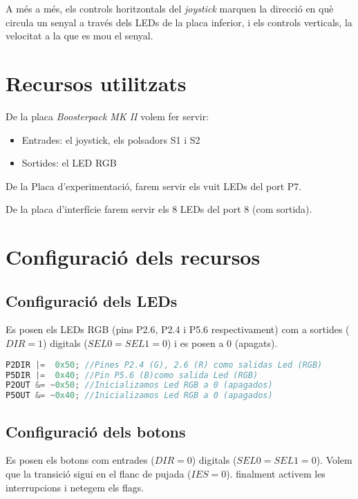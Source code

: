 \documentclass[12pt,a4paper]{article}
\begin{document}
A més a més, els controls horitzontals del \textit{joystick} marquen la direcció
en què circula un senyal a través dels LEDs de la placa inferior, i els controls
verticals, la velocitat a la que es mou el senyal.

\section{Recursos utilitzats}
De la placa \textit{Boosterpack MK II} volem fer servir:

\begin{itemize}
    \item Entrades: el joystick, els polsadors S1 i S2
    \item Sortides: el LED RGB
\end{itemize}

De la Placa d'experimentació, farem servir els vuit LEDs del port P7.

De la placa d'interfície farem servir els 8 LEDs del port 8 (com sortida).

\section{Configuració dels recursos}
\subsection{Configuració dels LEDs}
Es posen els LEDs RGB (pins P2.6, P2.4 i P5.6 respectivament) com a sortides ($DIR = 1$) digitals ($SEL0 = SEL1 = 0$) i es posen a 0 (apagats).

\begin{lstlisting}[language=C++]
P2DIR |=  0x50; //Pines P2.4 (G), 2.6 (R) como salidas Led (RGB)
P5DIR |=  0x40; //Pin P5.6 (B)como salida Led (RGB)
P2OUT &= ~0x50; //Inicializamos Led RGB a 0 (apagados)
P5OUT &= ~0x40; //Inicializamos Led RGB a 0 (apagados)
\end{lstlisting}

\subsection{Configuració dels botons}

Es posen els botons com entrades ($DIR = 0$) digitals ($SEL0 = SEL1 = 0$). Volem que la transició sigui en el flanc de pujada ($IES = 0$). finalment activem les interrupcions i netegem els flags.
\end{document}
